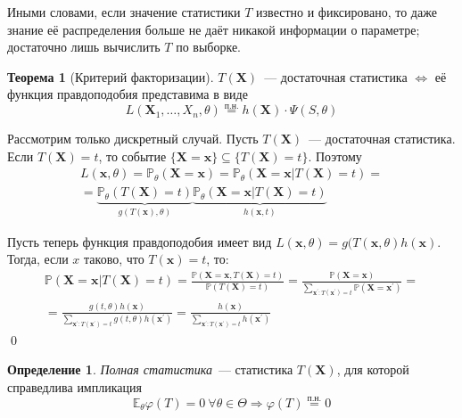 \documentclass[oneside,final,14pt]{extreport}
\renewenvironment{proof}{{\bfseries Доказательство.}}{\qed}
\theoremstyle{plain}
\theoremstyle{definition}
\newtheorem*{defn}{Определение}
\theoremstyle{named}
\newtheorem*{namedthm}{Теорема}
\begin{document}
Иными словами, если значение статистики $T$ известно и фиксировано, то даже знание её распределения больше не даёт никакой информации о параметре; достаточно лишь вычислить $T$ по выборке.

\begin{namedthm}[Критерий факторизации]
$T(\mathbf{X})$~--- достаточная статистика $\Leftrightarrow$ её функция правдоподобия представима в виде 
\begin{equation*}
    L(\mathbf{X}_{1}, \ldots, X_{n} , \theta) \stackrel{\text{п.н.}}{=} h(\mathbf{X}) \cdot \Psi(S, \theta)
\end{equation*}
\end{namedthm}

\begin{proof}
Рассмотрим только дискретный случай. Пусть $T(\mathbf{X})$~--- достаточная статистика. Если $T(\mathbf{X})=t$, то событие $\{\mathbf{X}=\mathbf{x}\} \subseteq \{T(\mathbf{X})=t\}$. Поэтому
\begin{multline*}
    L(\mathbf{x}, \theta) = \mathbb{P}_{\theta}(\mathbf{X}=\mathbf{x})=\mathbb{P}_{\theta}(\mathbf{X}=\mathbf{x} | T(\mathbf{X})=t) =\\
    = \underbrace{\mathbb{P}_{\theta}(T(\mathbf{X})=t)}_{g(T(\mathbf{x}), \theta)} \underbrace{\mathbb{P}_{\theta}(\mathbf{X}=\mathbf{x} | T(\mathbf{X})=t)}_{h(\mathbf{x}, t)}
\end{multline*}

Пусть теперь функция правдоподобия имеет вид $L(\mathbf{x}, \theta)=g(T(\mathbf{x}, \theta) h(\mathbf{x})$. Тогда, если $x$ таково, что $T(\mathbf{x})=t$, то:
\begin{multline*}
    \mathbb{P}(\mathbf{X}=\mathbf{x} | T(\mathbf{X})=t) =\frac{\mathbb{P}(\mathbf{X}=\mathbf{x}, T(\mathbf{X})=t)}{\mathbb{P}(T(\mathbf{X})=t)}
    =\frac{\mathbb{P}(\mathbf{X}=\mathbf{x})}{\sum\limits_{\mathbf{x}^{\prime}: T(\mathbf{x}^{\prime})=t} \mathbb{P}(\mathbf{X}=\mathbf{x}^{\prime})} = \\
    = \frac{g(t, \theta) h(\mathbf{x})}{\sum\limits_{\mathbf{x}^{\prime}: T(\mathbf{x}^{\prime})=t} g(t, \theta) h(\mathbf{x}^{\prime})}
    = \frac{h(\mathbf{x})}{\sum\limits_{\mathbf{x}^{\prime}: T(\mathbf{x}^{\prime})=t} h(\mathbf{x}^{\prime})}
\end{multline*}
\end{proof}

\begin{defn}
{\it Полная статистика}~--- статистика $T(\mathbf{X})$, для которой справедлива импликация
\begin{equation*}
    \mathbb{E}_{\theta} \varphi(T)=0~\forall \theta \in \Theta \Rightarrow \varphi(T) \stackrel{\text{п.н.}}{=}0
\end{equation*}
\end{defn}
\end{document}
